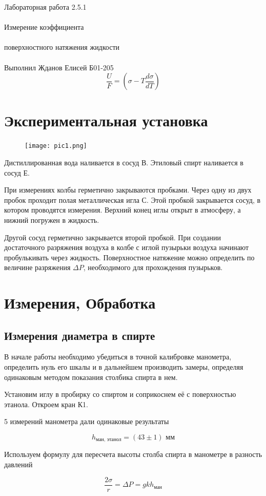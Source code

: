 \documentclass{astroedu-lab}
\begin{document}
\begin{problem}{\huge Лабораторная работа 2.5.1\\\\Измерение коэффициента\\\\поверхностного натяжения жидкости\\\\Выполнил Жданов Елисей Б01-205}
\begin{equation}
	\frac{U}{F} = \left( \sigma - T \frac{d \sigma}{d T} \right)
\end{equation}
 
\section{Экспериментальная установка}

\begin{figure}[!h]
	\centering
	\texttt{[image: pic1.png]}
	\label{fig:boiler}
\end{figure}

Дистиллированная вода наливается в сосуд В. Этиловый спирт наливается в сосуд Е.

При измерениях  колбы герметично закрываются  пробками. Через одну из двух пробок  проходит полая металлическая игла С. Этой пробкой закрывается сосуд, в котором  проводятся измерения. Верхний конец иглы открыт в атмосферу, а нижний погружен в жидкость.

Другой сосуд герметично закрывается второй пробкой. При создании достаточного  разряжения воздуха в колбе с иглой пузырьки воздуха начинают пробулькивать через жидкость. Поверхностное натяжение можно определить по величине разряжения $\Delta P$, необходимого для прохождения пузырьков.

\section{Измерения, Обработка}

\subsection{Измерения диаметра в спирте}

В начале работы необходимо убедиться в точной калибровке манометра, определить нуль его шкалы и в дальнейшем производить замеры, определяя одинаковым методом показания столбика спирта в нем.

Установим иглу в пробирку со спиртом и соприкоснем её с поверхностью этанола. Откроем кран К1.

5 измерений манометра дали одинаковые результаты

\[
	h _\text{ман, этанол} = (43 \pm 1) \text{ мм}
\]

Используем формулу для пересчета высоты столба спирта в манометре в разность давлений

\begin{equation}
	\frac{2 \sigma}{r} = \Delta P = g k h_\text{ман}
\end{equation}


\end{problem}
\end{document}
